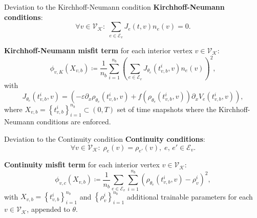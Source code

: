 \documentclass[9pt]{beamer}
\begin{document}
\begin{frame}{Deviation to the Kirchhoff-Neumann condition}
    \textbf{Kirchhoff-Neumann conditions}:
    \begin{equation*}
        \forall v \in \mathcal{V}_\mathcal{K} \colon \; \sum_{e\in \mathcal{E}_v} J_e \left( t,v \right)  n_e  \left( v \right) =0.
    \end{equation*}
    

    \vspace{3mm}

    \textbf{Kirchhoff-Neumann misfit term} for each interior vertex $v \in \mathcal{V}_{\mathcal{K}}$:
    \begin{equation*} 
        \phi_{v,K}  \left( X_{v,b} \right) \coloneqq \frac{1}{n_b} \sum_{i=1}^{n_b}  \left( \sum_{e \in \mathcal{E}_v}  J_{\theta_e}\left( t_{v,b}^i, v \right)  n_e  \left( v \right) \right)^2, 
    \end{equation*} 
    with 
    \begin{equation*} 
        J_{\theta_e}\left( t_{v,b}^i, v \right) = \left( - \varepsilon \partial_x \rho_{\theta_e}  \left( t_{v,b}^i, v \right) + f \left( \rho_{\theta_e}  \left( t_{v,b}^i, v \right) \right) \partial_x V_e \left( t_{v,b}^i, v \right) \right),
    \end{equation*}
    where $X_{v,b} = \left\{ t_{v,b}^i \right\}_{i=1}^{n_b} \subset \left( 0,T \right)$ set of time snapshots where the Kirchhoff-Neumann conditions are enforced.
\end{frame}



\begin{frame}{Deviation to the Continuity condition}
    \textbf{Continuity conditions}:
    \begin{equation*}
        \forall v \in \mathcal{V}_\mathcal{K} \colon \; \rho_e \left( v \right)  = \rho_{e'} \left( v \right), \; e,\,e' \in \mathcal{E}_v.
    \end{equation*}

    \vspace{3mm}

    \textbf{Continuity misfit term} for each interior vertex $v \in \mathcal{V}_{\mathcal{K}}$:
    \begin{equation*} 
        \phi_{v,c}  \left( X_{v,b} \right) \coloneqq \frac{1}{n_b} \sum_{e \in \mathcal{E}_v} \sum_{i=1}^{n_b} \left(  \rho_{\theta_e}  \left( t_{v,b}^i, v \right) - \rho_{v}^i \right)^2,
    \end{equation*} 
    with $X_{v,b} = \left\{ t_{v,b}^i \right\}_{i=1}^{n_b}$ and $\left\{ \rho_{v}^i \right\}_{i=1}^{n_b}$ additional trainable parameters for each $v \in \mathcal{V}_{\mathcal{K}}$, appended to $\theta$.
\end{frame}
\end{document}

